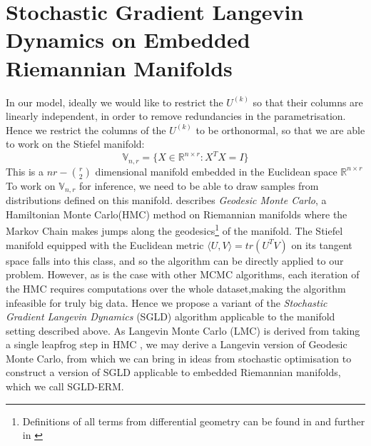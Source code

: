\documentclass[a4paper,10pt]{article}
\begin{document}
\section{Stochastic Gradient Langevin Dynamics on Embedded Riemannian Manifolds}
In our model, ideally we would like to restrict the $U^{(k)}$ so that their columns are linearly independent, in order to remove redundancies in the parametrisation. Hence we restrict the columns of the $U^{(k)}$ to be orthonormal, so that we are able to work on the Stiefel manifold:
\begin{equation}
\mathbb{V}_{n,r}=\{X \in \mathbb{R}^{n \times r}: X^TX=I \}
\end{equation}
This is a $nr-{r \choose 2}$ dimensional manifold embedded in the Euclidean space $\mathbb{R}^{n \times r}$
To work on $\mathbb{V}_{n,r}$ for inference, we need to be able to draw samples from distributions defined on this manifold. \cite{byrne2013geodesic} describes \textit{Geodesic Monte Carlo}, a Hamiltonian Monte Carlo(HMC) method on Riemannian manifolds where the Markov Chain makes jumps along the geodesics\footnote{Definitions of all terms from differential geometry can be found in \cite{byrne2013geodesic} and further in \cite{edelman1998geometry}} of the manifold.
The Stiefel manifold equipped with the Euclidean metric $\langle U,V\rangle=tr(U^TV)$ on its tangent space falls into this class, and so the algorithm can be directly applied to our problem. However, as is the case with other MCMC algorithms, each iteration of the HMC requires computations over the whole dataset,making the algorithm infeasible for truly big data. Hence we propose a variant of the \textit{Stochastic Gradient Langevin Dynamics} (SGLD) \cite{welling2011bayesian} algorithm  applicable to the manifold setting described above. As Langevin Monte Carlo (LMC) is derived from taking a single leapfrog step in HMC \cite{neal2011mcmc}, we may derive a Langevin version of Geodesic Monte Carlo, from which we can bring in ideas from stochastic optimisation to construct a version of SGLD applicable to embedded Riemannian manifolds, which we call SGLD-ERM.
\end{document}
